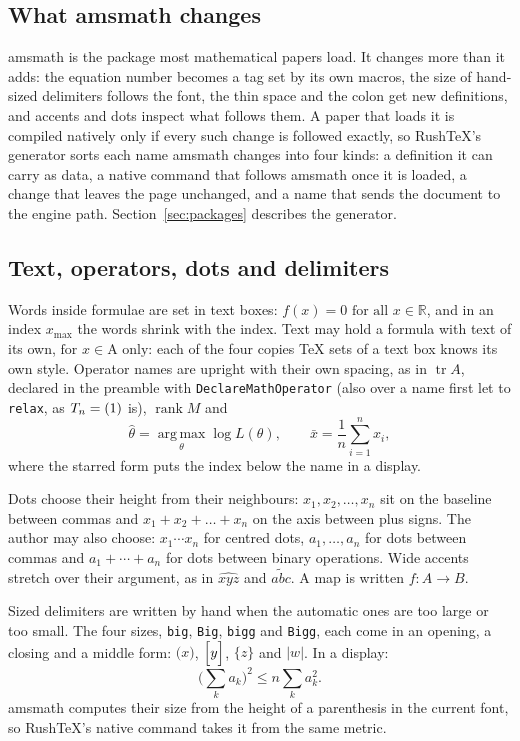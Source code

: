 \documentclass{article}
\numberwithin{equation}{section}
\DeclareMathOperator{\tr}{tr}
\let\rtop\relax
\DeclareMathOperator*{\rtop}{o_P}
\theoremstyle{definition}
\theoremstyle{remark}
\begin{document}
\subsection{What amsmath changes}

amsmath is the package most mathematical papers load. It changes more than it adds:
the equation number becomes a tag set by its own macros, the size of hand-sized
delimiters follows the font, the thin space and the colon get new definitions, and
accents and dots inspect what follows them. A paper that loads it is compiled natively
only if every such change is followed exactly, so RushTeX's generator sorts each name
amsmath changes into four kinds: a definition it can carry as data, a native command
that follows amsmath once it is loaded, a change that leaves the page unchanged, and a
name that sends the document to the engine path. Section~\ref{sec:packages} describes
the generator.

\subsection{Text, operators, dots and delimiters}

Words inside formulae are set in text boxes: $f(x) = 0 \text{ for all } x \in
\mathbb{R}$, and in an index $x_{\text{max}}$ the words shrink with the index. Text
may hold a formula with text of its own, $\text{for $x \in \text{A}$ only}$: each of
the four copies \TeX{} sets of a text box knows its own style. Operator
names are upright with their own spacing, as in $\tr A$, declared in the preamble with
\texttt{DeclareMathOperator} (also over a name first let to \texttt{relax}, as
$T_n = \rtop(1)$ is), $\operatorname{rank} M$ and
\[
  \hat{\theta} = \operatorname*{arg\,max}_{\theta} \log L(\theta), \qquad
  \bar{x} = \frac{1}{n} \sum_{i=1}^{n} x_i ,
\]
where the starred form puts the index below the name in a display.

Dots choose their height from their neighbours: $x_1, x_2, \dots, x_n$ sit on the
baseline between commas and $x_1 + x_2 + \dots + x_n$ on the axis between plus signs.
The author may also choose: $x_1 \cdots x_n$ for centred dots, $a_1, \dotsc, a_n$ for
dots between commas and $a_1 + \dotsb + a_n$ for dots between binary operations. Wide
accents stretch over their argument, as in $\widehat{xyz}$ and $\widetilde{abc}$. A map
is written $f\colon A \to B$.

Sized delimiters are written by hand when the automatic ones are too large or too
small. The four sizes, \texttt{big}, \texttt{Big}, \texttt{bigg} and \texttt{Bigg},
each come in an opening, a closing and a middle form: $\bigl( x \bigr)$, $\Bigl[ y
\Bigr]$, $\biggl\{ z \biggr\}$ and $\Biggl| w \Biggr|$. In a display:
\[
  \Big( \sum_{k} a_k \Big)^{2} \le n \sum_{k} a_k^{2} .
\]
amsmath computes their size from the height of a parenthesis in the current font, so
RushTeX's native command takes it from the same metric.
\end{document}
